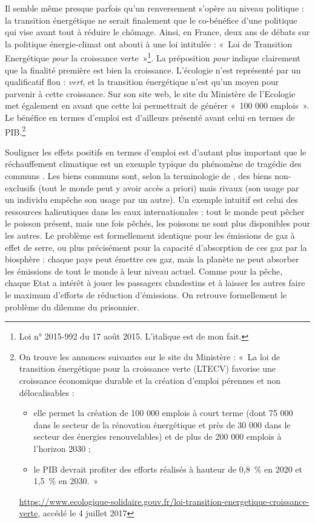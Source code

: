 Il semble même presque parfois qu’un renversement s’opère au niveau politique : la transition énergétique ne serait finalement que le co-bénéfice d’une politique qui vise avant tout à réduire le chômage. Ainsi, en France, deux ans de débats sur la politique énergie-climat ont abouti à une loi intitulée : «~Loi de Transition Energétique \textit{pour} la croissance verte~»\footnote{Loi n° 2015-992 du 17 août 2015. L'italique est de mon fait.
}. La préposition \textit{pour} indique clairement que la finalité première est bien la croissance. L'écologie n'est représenté par un qualificatif flou : \textit{vert}, et la transition énergétique n'est qu'un moyen pour parvenir à cette croissance. 
Sur son site web, le site du Ministère de l'Ecologie met également en avant que cette loi permettrait de générer «~100 000 emplois~». Le bénéfice en termes d'emploi est d'ailleurs présenté avant celui en termes de PIB.\footnote{On trouve les annonces suivantes sur le site du Ministère : «~La loi de transition énergétique pour la croissance verte (LTECV) favorise une croissance économique durable et la création d'emploi pérennes et non délocalisables :
\begin{itemize}
	\item elle permet la création de 100 000 emplois à court terme (dont 75 000 dans le secteur de la rénovation énergétique et près de 30 000 dans le secteur des énergies renouvelables) et de plus de 200 000 emplois à l’horizon 2030 ;
	\item le PIB devrait profiter des efforts réalisés à hauteur de 0,8~\% en 2020 et 1,5~\% en 2030.~»
\end{itemize}
\url{https://www.ecologique-solidaire.gouv.fr/loi-transition-energetique-croissance-verte}, accédé le 4 juillet 2017
}

Souligner les effets positifs en termes d’emploi est d’autant plus important que le réchauffement climatique est un exemple typique du phénomène de tragédie des communs \citep{Hardin1968}. Les biens communs sont, selon la terminologie de \citet{Samuelson1954}, des biens non-exclusifs (tout le monde peut y avoir accès a priori) mais rivaux (son usage par un individu empêche son usage par un autre). Un exemple intuitif est celui des ressources halieutiques dans les eaux internationales : tout le monde peut pêcher le poisson présent, mais une fois pêchés, les poissons ne sont plus disponibles pour les autres.
Le problème est formellement identique pour les émissions de gaz à effet de serre, ou plus précisément pour la capacité d'absorption de ces gaz par la biosphère : chaque pays peut émettre ces gaz, mais la planète ne peut absorber les émissions de tout le monde à leur niveau actuel.
Comme pour la pêche, chaque Etat a intérêt à jouer les passagers clandestins et à laisser les autres faire le maximum d’efforts de réduction d'émissions. On retrouve formellement le problème du dilemme du prisonnier.

